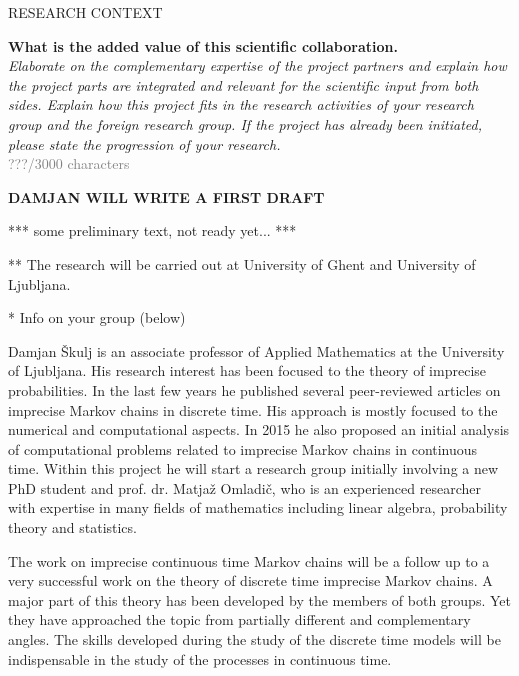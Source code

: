 \documentclass[11pt,dvipsnames,usenames,a4paper]{article}
\begin{document}


\vspace{7pt}




\vspace{5mm}

\begin{shaded}\centering RESEARCH CONTEXT \end{shaded}
\textbf{What is the added value of this scientific collaboration.}\\
\textit{Elaborate on the complementary expertise of the project partners and explain how the project parts are integrated and relevant for the scientific input from both sides. Explain how this project fits in the research activities of your research group and the foreign research group. If the project has already been initiated, please state the progression of your research.}\\
\textcolor{Gray}{???/3000 characters}

{\color{blue}\bf DAMJAN WILL WRITE A FIRST DRAFT}

*** some preliminary text, not ready yet... ***

**
The research will be carried out at University of Ghent and University of Ljubljana. 

* Info on your group (below) 


Damjan \v Skulj is an associate professor of Applied Mathematics at the University of Ljubljana. His research interest has been focused to the theory of imprecise probabilities. In the last few years he published several peer-reviewed articles on imprecise Markov chains in discrete time. His approach is mostly focused to the numerical and computational aspects. In 2015 he also proposed an initial analysis of computational problems related to imprecise Markov chains in continuous time. Within this project he will start a research group initially involving a new PhD student and prof. dr. Matjaž Omladič, who is an experienced researcher with expertise in many fields of mathematics including linear algebra, probability theory and statistics. 

The work on imprecise continuous time Markov chains will be a follow up to a very successful work on the theory of discrete time imprecise Markov chains. A major part of this theory has been developed by the members of both groups. Yet they have approached the topic from partially different and complementary angles. The skills developed during the study of the discrete time models will be indispensable in the study of the processes in continuous time. 
\end{document}

